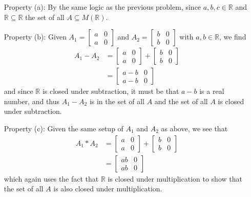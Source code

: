 \documentclass{article}
\begin{document}
\begin{enumerate}
			\begin{enumerate}
				\item [Property (a):] By the same logic as the previous problem, since $a, b, c \in 
					\mathbb{R}$ and $\mathbb{R} \subseteq \mathbb{R}$ the set of all 
					$A \subseteq M(\mathbb{R})$.
				\item [Property (b):] Given $A_1 = \begin{bmatrix} a & 0 \\ a & 0 \end{bmatrix}$ and 
					$A_2 = \begin{bmatrix} b & 0 \\ b & 0 \end{bmatrix}$ with $a, b \in \mathbb{R}$,
					we find
					\begin{align*}
						A_1 - A_2 & = \begin{bmatrix} a & 0 \\ a & 0 \end{bmatrix} 
									+ \begin{bmatrix} b & 0 \\ b & 0 \end{bmatrix} \\
								  & = \begin{bmatrix} a - b & 0 \\ a - b & 0 \end{bmatrix} 
					\end{align*}
					and since $\mathbb{R}$ is closed under subtraction, it must be that $a - b$ is a
					real number, and thus $A_1 - A_2$ is in the set of all $A$ and the set of all 
					$A$ is closed under subtraction. 
				\item [Property (c):] Given the same setup of $A_1$ and $A_2$ as above, we see that
					\begin{align*}
						A_1 * A_2 & = \begin{bmatrix} a & 0 \\ a & 0 \end{bmatrix} 
									+ \begin{bmatrix} b & 0 \\ b & 0 \end{bmatrix} \\
								  & = \begin{bmatrix} ab & 0 \\ ab & 0 \end{bmatrix} 
					\end{align*}
					which again uses the fact that $\mathbb{R}$ is closed under multiplication to 
					show that the set of all $A$ is also closed under multiplication.
			\end{enumerate}


\end{enumerate}
\end{document}
